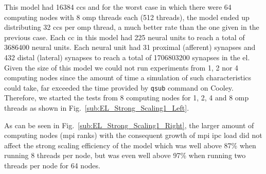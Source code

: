 \documentclass[10pt,journal,compsoc]{IEEEtran}
\begin{document}
This model had 16384 \glspl{cc} and for the worst case in which there were 64 computing nodes with 8 \gls{omp} threads each (512 threads), the model ended up distributing 32 \glspl{cc} per \gls{omp} thread, a much better rate than the one given in the previous case. Each \gls{cc} in this model had 225 neural units to reach a total of 3686400 neural units. Each neural unit had 31 proximal (afferent) synapses and 432 distal (lateral) synapses to reach a total of 1706803200 synapses in the \gls{el}. Given the size of this model we could not run experiments from 1, 2 nor 4 computing nodes since the amount of time a simulation of such characteristics could take, far exceeded the time provided by \texttt{qsub} command on Cooley. Therefore, we started the tests from 8 computing nodes for 1, 2, 4 and 8 \gls{omp} threads as shown in Fig.~\ref{sub:EL_Strong_Scaling1_Left}.





As can be seen in Fig.~\ref{sub:EL_Strong_Scaling1_Right}, the larger amount of computing nodes (\gls{mpi} ranks) with the consequent growth of \gls{mpi} \gls{ipc} load did not affect the strong scaling efficiency of the model which was well above 87\% when running 8 threads per node, but was even well above 97\% when running two threads per node for 64 nodes.
\end{document}
